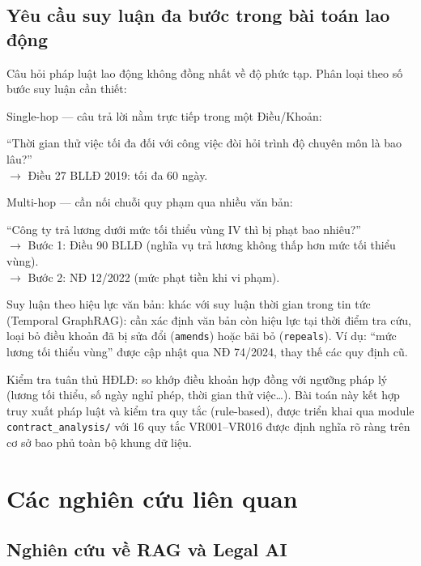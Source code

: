 \documentclass[../DoAn.tex]{subfiles}
\begin{document}
\subsection{Yêu cầu suy luận đa bước trong bài toán lao động}
\label{subsection:2.1.3}

Câu hỏi pháp luật lao động không đồng nhất về độ phức tạp. Phân loại theo số bước suy luận cần thiết:

Single-hop --- câu trả lời nằm trực tiếp trong một Điều/Khoản:
\begin{example}
``Thời gian thử việc tối đa đối với công việc đòi hỏi trình độ chuyên môn là bao lâu?''\\
$\rightarrow$ Điều 27 BLLĐ 2019: tối đa 60 ngày.
\end{example}

Multi-hop --- cần nối chuỗi quy phạm qua nhiều văn bản:
\begin{example}
``Công ty trả lương dưới mức tối thiểu vùng IV thì bị phạt bao nhiêu?''\\
$\rightarrow$ Bước 1: Điều 90 BLLĐ (nghĩa vụ trả lương không thấp hơn mức tối thiểu vùng).\\
$\rightarrow$ Bước 2: NĐ 12/2022 (mức phạt tiền khi vi phạm).
\end{example}

Suy luận theo hiệu lực văn bản: khác với suy luận thời gian trong tin tức (Temporal GraphRAG): cần xác định văn bản còn hiệu lực tại thời điểm tra cứu, loại bỏ điều khoản đã bị sửa đổi (\texttt{amends}) hoặc bãi bỏ (\texttt{repeals}). Ví dụ: ``mức lương tối thiểu vùng'' được cập nhật qua NĐ 74/2024, thay thế các quy định cũ.

Kiểm tra tuân thủ HĐLĐ: so khớp điều khoản hợp đồng với ngưỡng pháp lý (lương tối thiểu, số ngày nghỉ phép, thời gian thử việc\ldots). Bài toán này kết hợp truy xuất pháp luật và kiểm tra quy tắc (rule-based), được triển khai qua module \texttt{contract\_analysis/} với 16 quy tắc VR001--VR016 được định nghĩa rõ ràng trên cơ sở bao phủ toàn bộ khung dữ liệu.

\section{Các nghiên cứu liên quan}
\label{section:2.2}

\subsection{Nghiên cứu về RAG và Legal AI}
\label{subsection:2.2.1}
\end{document}

